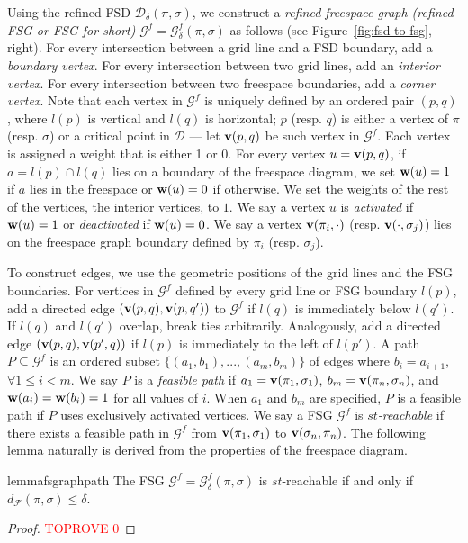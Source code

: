 \documentclass[thm-restate]{lipics-v2021}
\theoremstyle{remark}
\newcommand{\weight}[1]{\normalfont \textbf{w}(#1)}
\newcommand{\graph}[0]{\mathcal{G}}
\newcommand{\df}[1]{d_{\mathcal{F}}(#1)}
\newcommand{\fd}[2]{\mathcal{D}_{#2}(#1)}
\newcommand{\D}{\mathcal{D}}
\newcommand{\vertex}[1]{\normalfont \textbf{v}(#1)}
\newcommand{\fsgraph}[0]{\graph^{f}}
\begin{document}
Using the refined FSD $\fd{\pi, \sigma}{\delta}$, we construct a \emph{refined freespace graph (refined FSG or FSG for short)} $\fsgraph = \fsgraph_\delta(\pi, \sigma)$ as follows (see Figure~\ref{fig:fsd-to-fsg}, right). For every intersection between a grid line and a FSD boundary, add a \emph{boundary vertex}. For every intersection between two grid lines, add an \emph{interior vertex}. For every intersection between two freespace boundaries, add a \emph{corner vertex}. Note that each vertex in $\fsgraph$ is uniquely defined by an ordered pair $(p, q)$, where $l(p)$ is vertical and $l(q)$ is horizontal; $p$ (resp. $q$) is either a vertex of $\pi$ (resp. $\sigma$) or a critical point in $\D$ --- let $\vertex{p, q}$ be such vertex in $\fsgraph$. Each vertex is assigned a weight that is either 1 or 0. For every vertex $u = \vertex{p, q}$, if $a = l(p) \cap l(q)$ lies on a boundary of the freespace diagram, we set $\weight{u} = 1$ if $a$ lies in the freespace or $\weight{u} = 0$ if otherwise. We set the weights of the rest of the vertices, the interior vertices, to $1$. We say a vertex $u$ is \emph{activated} if $\weight{u} = 1$ or \emph{deactivated} if $\weight{u} = 0$. We say a vertex $\vertex{\pi_i, \cdot}$ (resp. $\vertex{\cdot, \sigma_j}$) lies on the freespace graph boundary defined by $\pi_i$ (resp. $\sigma_j$). 

To construct edges, we use the geometric positions of the grid lines and the FSG boundaries. For vertices in $\fsgraph$ defined by every grid line or FSG boundary $l(p)$, add a directed edge $(\vertex{p, q}, \vertex{p, q'})$ to $\fsgraph$ if $l(q)$ is immediately below $l(q')$. If $l(q)$ and $l(q')$ overlap, break ties arbitrarily. Analogously, add a directed edge $(\vertex{p, q}, \vertex{p', q})$ if $l(p)$ is immediately to the left of $l(p')$. A path $P \subseteq \fsgraph$ is an ordered subset $\{(a_1, b_1), ..., (a_m, b_m)\}$ of edges where $b_i = a_{i + 1}$, $\forall 1 \leq i < m$. We say $P$ is a \emph{feasible path} if $a_1 = \vertex{\pi_1, \sigma_1}$, $b_m = \vertex{\pi_n, \sigma_n}$, and $\weight{a_i} = \weight{b_i} = 1$ for all values of $i$. When $a_1$ and $b_m$ are specified, $P$ is a feasible path if $P$ uses exclusively activated vertices. We say a FSG $\fsgraph$ is \emph{$st$-reachable} if there exists a feasible path in $\fsgraph$ from $\vertex{\pi_1, \sigma_1}$ to $\vertex{\sigma_n, \pi_n}$. The following lemma naturally is derived from the properties of the freespace diagram. 
\begin{restatable}{lemma}{fsgraphpath} \label{lem:fsgraph-path}
    The FSG $\fsgraph = \fsgraph_\delta(\pi, \sigma)$ is $st$-reachable if and only if $\df{\pi, \sigma} \leq \delta$. 
\end{restatable}
\begin{proof}\textcolor{red}{TOPROVE 0}\end{proof}
\end{document}
